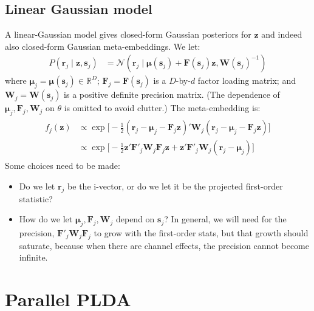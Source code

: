 \documentclass[a4paper,oneside,12pt,english]{report}
\def\zvec{\mathbf{z}}
\def\ND{\mathcal{N}}
\def\R{\mathbb{R}}
\def\Wmat{\mathbf{W}}
\def\Fmat{\mathbf{F}}
\def\svec{\mathbf{s}}
\def\rvec{\mathbf{r}}
\def\muvec{\boldsymbol{\mu}}
\begin{document}
\subsection{Linear Gaussian model}
A linear-Gaussian model gives closed-form Gaussian posteriors for $\zvec$ and indeed also closed-form Gaussian meta-embeddings. We let:
\begin{align}
P(\rvec_j\mid\zvec,\svec_j) &= \ND(\rvec_j\mid \muvec(\svec_j) + \Fmat(\svec_j)\zvec,\Wmat(\svec_j)^{-1})
\end{align} 
where $\muvec_j=\muvec(\svec_j)\in\R^D$; $\Fmat_j=\Fmat(\svec_j)$ is a $D$-by-$d$ factor loading matrix; and $\Wmat_j=\Wmat(\svec_j)$ is a positive definite precision matrix. (The dependence of $\muvec_j,\Fmat_j,\Wmat_j$ on $\theta$ is omitted to avoid clutter.) The meta-embedding is:
\begin{align}
\begin{split}
f_j(\zvec) &\propto \exp\bigl[
-\frac12(\rvec_j-\muvec_j-\Fmat_j\zvec)'\Wmat_j(\rvec_j-\muvec_j-\Fmat_j\zvec)\bigr]\\
&\propto \exp\bigl[-\frac12\zvec'\Fmat'_j\Wmat_j\Fmat_j\zvec +\zvec'\Fmat'_j\Wmat_j(\rvec_j-\muvec_j)
\bigr]
\end{split}
\end{align}
Some choices need to be made:
\begin{itemize}
	\item Do we let $\rvec_j$ be the i-vector, or do we let it be the projected first-order statistic?
	\item How do we let $\muvec_j,\Fmat_j,\Wmat_j$ depend on $\svec_j$? In general, we will need for the precision, $\Fmat'_j\Wmat_j\Fmat_j$ to grow with the first-order stats, but that growth should saturate, because when there are channel effects, the precision cannot become infinite.
\end{itemize}


\section{Parallel PLDA}
\end{document}
